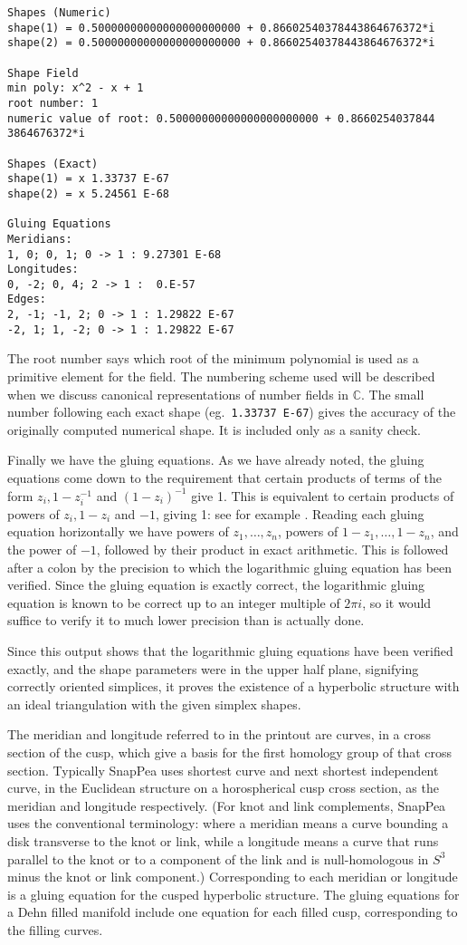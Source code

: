 \documentclass[a4paper]{amsart}
\def\C{{\mathbb C}}
\theoremstyle{definition}
\begin{document}
\begin{verbatim}
Shapes (Numeric)
shape(1) = 0.50000000000000000000000 + 0.86602540378443864676372*i
shape(2) = 0.50000000000000000000000 + 0.86602540378443864676372*i

Shape Field
min poly: x^2 - x + 1
root number: 1
numeric value of root: 0.50000000000000000000000 + 0.8660254037844
3864676372*i

Shapes (Exact)
shape(1) = x 1.33737 E-67
shape(2) = x 5.24561 E-68

Gluing Equations
Meridians:
1, 0; 0, 1; 0 -> 1 : 9.27301 E-68
Longitudes:
0, -2; 0, 4; 2 -> 1 :  0.E-57
Edges:
2, -1; -1, 2; 0 -> 1 : 1.29822 E-67
-2, 1; 1, -2; 0 -> 1 : 1.29822 E-67
\end{verbatim}

The root number says which root of the minimum polynomial is used as a
primitive element for the field. The numbering scheme used will be
described when we discuss canonical representations of number fields
in $\C$. The small number following each exact shape 
(eg.\ {\tt 1.33737 E-67}) gives the accuracy of the 
originally computed numerical shape. It is included 
only as a sanity check.

Finally we have the gluing equations. As we have already
noted, the gluing equations come down to the requirement that certain
products of terms of the form $z_i, 1 - z_i^{-1}$ and $(1 - z_i)^{-1}$
give 1. This is equivalent to certain products of powers of
$z_i, 1-z_i$ and $-1$, giving 1: see for example \cite{nz}. Reading
each gluing equation horizontally we have powers of $z_1,\ldots,z_n$,
powers of $1-z_1,\ldots,1-z_n$, and the power of $-1$, followed by
their product in exact arithmetic.
This is followed after a colon by the precision to which the
logarithmic gluing equation has been verified.  Since the 
gluing equation is exactly correct, the logarithmic
gluing equation is known to be correct up to an integer multiple of $2\pi
i$, so it would suffice to verify it to much lower precision than 
is actually done.  

Since this output shows that the logarithmic gluing equations have
been verified exactly, and the shape parameters were in the upper half
plane, signifying correctly oriented simplices, it proves the
existence of a hyperbolic structure with an ideal triangulation with
the given simplex shapes.

The meridian and longitude referred to in the printout are curves, in
a cross section of the cusp, which give a basis for the first homology group
of that cross section. Typically SnapPea uses shortest curve and next
shortest independent curve, in the Euclidean structure on a horospherical cusp
cross section, as the meridian and longitude respectively.
(For knot and link complements, SnapPea uses the conventional 
terminology: where a meridian 
means a curve bounding a disk transverse to the knot or link, while a
longitude means a curve that
runs parallel to the knot or to a component of the link and is
null-homologous in $S^3$ minus the knot or link component.)
Corresponding to each meridian or longitude is a gluing equation for
the cusped hyperbolic structure. The gluing equations for a Dehn
filled manifold include  one equation for each filled
cusp, corresponding to the filling  curves. 
\end{document}
